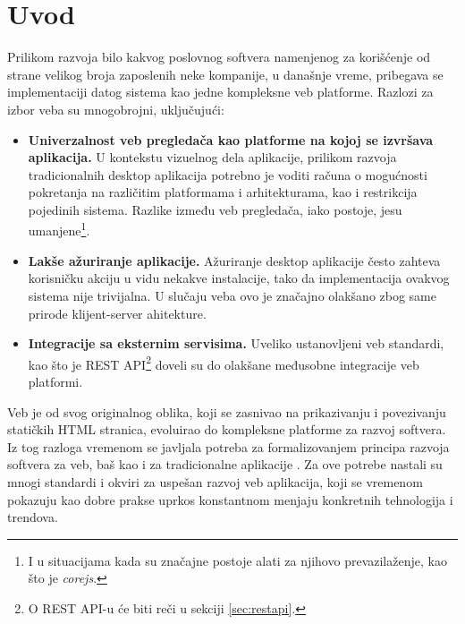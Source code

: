 \documentclass[12pt,oneside]{memoir}
\begin{document}
\frontmatter
\naslovna
\komisija
\apstrakt
\tableofcontents*

\mainmatter

\chapter{Uvod}

Prilikom razvoja bilo kakvog poslovnog softvera namenjenog za korišćenje od strane velikog broja zaposlenih neke kompanije, u današnje vreme, pribegava se implementaciji datog sistema kao jedne kompleksne veb platforme. Razlozi za izbor veba su mnogobrojni, uključujući:

\begin{itemize}
    \item \textbf{Univerzalnost veb pregledača kao platforme na kojoj se izvršava aplikacija.} U kontekstu vizuelnog dela aplikacije, prilikom razvoja tradicionalnih desktop aplikacija potrebno je voditi računa o mogućnosti pokretanja na različitim platformama i arhitekturama, kao i restrikcija pojedinih sistema. Razlike između veb pregledača, iako postoje, jesu umanjene\footnote{I u situacijama kada su značajne postoje alati za njihovo prevazilaženje, kao što je \textit{corejs}.}. 
    \item \textbf{Lakše ažuriranje aplikacije.} Ažuriranje desktop aplikacije često zahteva korisničku akciju u vidu nekakve instalacije, tako da implementacija ovakvog sistema nije trivijalna. U slučaju veba ovo je značajno olakšano zbog same prirode klijent-server ahitekture.
    \item \textbf{Integracije sa eksternim servisima.} Uveliko ustanovljeni veb standardi, kao što je REST API\footnote{O REST API-u će biti reči u sekciji \ref{sec:restapi}.} doveli su do olakšane međusobne integracije veb platformi.
\end{itemize}

Veb je od svog originalnog oblika, koji se zasnivao na prikazivanju i povezivanju statičkih HTML stranica, evoluirao do kompleksne platforme za razvoj softvera. Iz tog razloga vremenom se javljala potreba za formalizovanjem principa razvoja softvera za veb, baš kao i za tradicionalne aplikacije \cite{web_evolution}. Za ove potrebe nastali su mnogi standardi i okviri za uspešan razvoj veb aplikacija, koji se vremenom pokazuju kao dobre prakse uprkos konstantnom menjaju konkretnih tehnologija i trendova.
\end{document}
